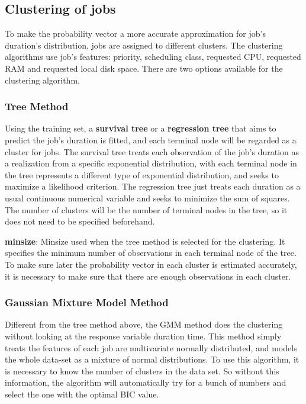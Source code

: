 \documentclass{article}
\begin{document}
\subsection{Clustering of jobs}

\begin{flushleft}
To make the probability vector a more accurate approximation for job's
duration's distribution, jobs are assigned to different clusters. The clustering
algorithms use job's features: priority, scheduling class, requested CPU,
requested RAM and requested local disk space. There are two options available
for the clustering algorithm.
\end{flushleft}

\subsubsection{Tree Method}

\begin{flushleft}
Using the training set, a \textbf{survival tree} or a \textbf{regression tree}
that aims to predict the job's duration is fitted, and each terminal node will
be regarded as a cluster for jobs. The survival tree treats each observation of
the job's duration as a realization from a specific exponential distribution,
with each terminal node in the tree represents a different type of exponential
distribution, and seeks to maximize a likelihood criterion. The regression tree
just treats each duration as a usual continuous numerical variable and seeks to
minimize the sum of squares. The number of clusters will be the number of
terminal nodes in the tree, so it does not need to be specified beforehand.
\end{flushleft}

\begin{flushleft}
\textbf{minsize}: Minsize used when the tree method is selected for the
clustering. It specifies the minimum number of observations in each terminal
node of the tree. To make sure later the probability vector in each cluster is
estimated accurately, it is necessary to make sure that there are enough
observations in each cluster.
\end{flushleft}

\subsubsection{Gaussian Mixture Model Method}

\begin{flushleft}
Different from the tree method above, the GMM method does the clustering without
looking at the response variable duration time. This method simply treats the
features of each job are multivariate normally distributed, and models the whole
data-set as a mixture of normal distributions. To use this algorithm, it is
necessary to know the number of clusters in the data set. So without this
information, the algorithm will automatically try for a bunch of numbers and
select the one with the optimal BIC value.
\end{flushleft}
\end{document}
